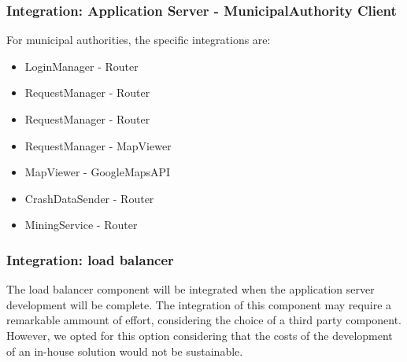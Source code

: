 \subsubsection{Integration: Application Server - MunicipalAuthority Client}
For municipal authorities, the specific integrations are:
\begin{itemize}
	\item LoginManager - Router
	\item RequestManager - Router
	\item RequestManager - Router
	\item RequestManager - MapViewer 
	\item MapViewer - GoogleMapsAPI
	\item CrashDataSender - Router	
	\item MiningService - Router
\end{itemize}

\subsubsection{Integration: load balancer}
The load balancer component will be integrated when the application server development will be complete. The integration of this component may require a remarkable ammount of effort, considering the choice of a third party component. However, we opted for this option considering that the costs of the development of an in-house solution would not be sustainable.